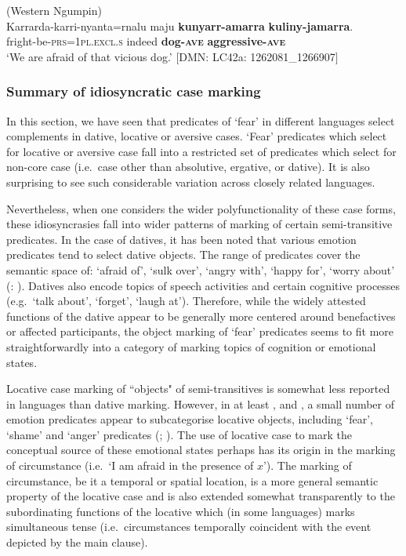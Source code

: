 \documentclass[output=paper,colorlinks,citecolor=brown]{langscibook}
\begin{document}
\ea 
\textnormal{ (Western Ngumpin)} \\
\gll Karrarda-karri-nyanta=rnalu maju \textbf{kunyarr-amarra} \textbf{kuliny-jamarra}. \\
fright-be-\textsc{prs=1pl.excl.s} indeed \textbf{dog-\textsc{ave}} \textbf{aggressive-\textsc{ave}} \\
\glt `We are afraid of that vicious dog.' $[$DMN: LC42a: 1262081\_1266907$]$
\label{ex:bro42}
\z



\subsubsection{Summary of idiosyncratic case marking}
\label{subsubsec:summaryidiosyncratic}

In this section, we have seen that predicates of `fear' in different  languages select complements in dative, locative or aversive cases. `Fear' predicates which select for locative or aversive case fall into a restricted set of predicates which select for non-core case (i.e.\  case other than absolutive, ergative, or dative). It is also surprising to see such considerable variation across closely related languages.

Nevertheless, when one considers the wider polyfunctionality of these case forms, these idiosyncrasies fall into wider patterns of marking of certain semi-transitive predicates. In the case of datives, it has been noted that various emotion predicates tend to select dative objects. The range of predicates cover the semantic space of: `afraid of', `sulk over', `angry with', `happy for', `worry about' (: \cite[571]{senge_grammar_2015}). Datives also encode topics of speech activities and certain cognitive processes (e.g.\  `talk about', `forget', `laugh at'). Therefore, while the widely attested functions of the dative appear to be generally more centered around benefactives or affected participants, the object marking of `fear' predicates seems to fit more straightforwardly into a category of marking topics of cognition or emotional states.

Locative case marking of ``objects" of semi-transitives is somewhat less reported in  languages than dative marking. However, in at least ,  and , a small number of emotion predicates appear to subcategorise locative objects, including `fear', `shame' and `anger' predicates (\cite[58]{tsunoda_djaru_1981}; \cite[529]{ennever_grammar_2021}). The use of locative case to mark the conceptual source of these emotional states perhaps has its origin in the marking of circumstance (i.e.\  `I am afraid in the presence of $x$'). The marking of circumstance, be it a temporal or spatial location, is a more general semantic property of the locative case and is also extended somewhat transparently to the subordinating functions of the locative which (in some  languages) marks simultaneous tense (i.e.\  circumstances temporally coincident with the event depicted by the main clause).
\end{document}
